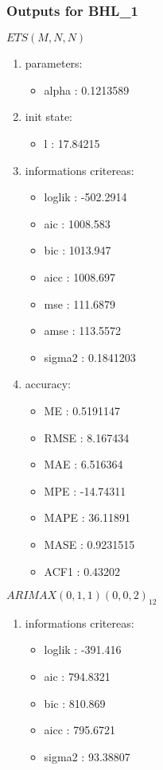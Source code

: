 \documentclass[10pt,a4paper]{article}\usepackage[]{graphicx}\usepackage[]{color}
\newcommand{\AaA}{\_}
\begin{document}
\subsubsection{Outputs for BHL\AaA 1}
\begin{multicols}{2}


$ ETS(M,N,N) $
\begin{enumerate}
\item parameters:
\begin{itemize}
\item  alpha :  0.1213589 
\end{itemize}
\item init state:
\begin{itemize}
\item  l :  17.84215 
\end{itemize}
\item informations critereas:
\begin{itemize}
\item  loglik :  -502.2914 
\item  aic :  1008.583 
\item  bic :  1013.947 
\item  aicc :  1008.697 
\item  mse :  111.6879 
\item  amse :  113.5572 
\item  sigma2 :  0.1841203 
\end{itemize}
\item accuracy:
\begin{itemize}
\item  ME :  0.5191147 
\item  RMSE :  8.167434 
\item  MAE :  6.516364 
\item  MPE :  -14.74311 
\item  MAPE :  36.11891 
\item  MASE :  0.9231515 
\item  ACF1 :  0.43202 
\end{itemize}
\end{enumerate}

\columnbreak


 $ARIMAX(0,1,1)(0,0,2)_{12}$ 
\begin{enumerate}
\item informations critereas:
\begin{itemize}
\item  loglik :  -391.416 
\item  aic :  794.8321 
\item  bic :  810.869 
\item  aicc :  795.6721 
\item  sigma2 :  93.38807 
\end{itemize}


\end{enumerate}
\end{multicols}
\end{document}
